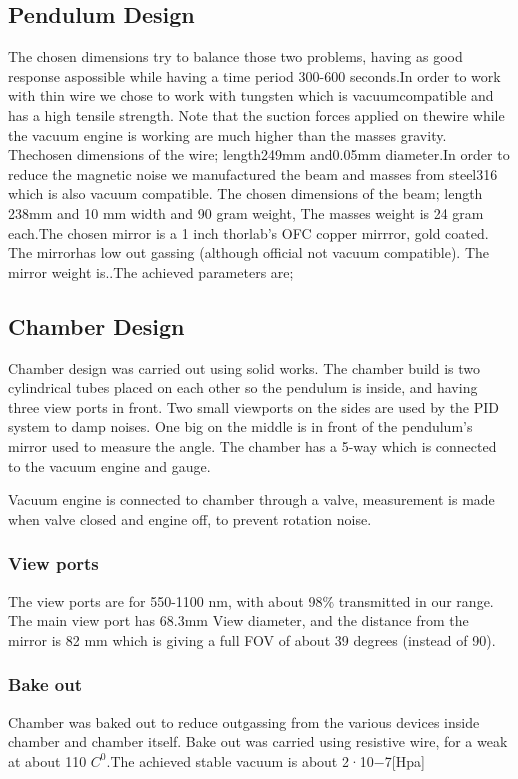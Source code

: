 \documentclass[\main/master.tex]{subfiles}
\begin{document}
\subsection{Pendulum Design}
The chosen dimensions try to balance those two problems, having as good response aspossible while having a time period 300-600 seconds.In order to work with thin wire we chose to work with tungsten which is vacuumcompatible and has a high tensile strength. Note that the suction forces applied on thewire while the vacuum engine is working are much higher than the masses gravity. Thechosen dimensions of the wire; length249mm and0.05mm diameter.In order to reduce the magnetic noise we manufactured the beam and masses from steel316 which is also vacuum compatible. The chosen dimensions of the beam; length 238mm and 10 mm width and 90 gram weight, The masses weight is 24 gram each.The chosen mirror is a 1 inch thorlab’s OFC copper mirrror, gold coated. The mirrorhas low out gassing (although official not vacuum compatible). The mirror weight is..The achieved parameters are;
\subsection{Chamber Design}
Chamber design was carried out using solid works. The chamber build is two cylindrical tubes placed on each other so the pendulum is inside, and having three view ports in front. Two small viewports on the sides are used by the PID system to damp noises. One big on the middle is in front of the pendulum's mirror  used to measure the angle. The chamber has a 5-way which is connected to the vacuum engine and gauge. 
\par
Vacuum engine is connected to chamber through a valve, measurement is made when valve closed and engine off, to prevent rotation noise.
\par
 
\subsubsection{View ports}
The view ports are for 550-1100 nm, with about 98$\%$ transmitted in our range. The main view port has 68.3mm View diameter, and the distance from the mirror is 82 mm which is giving a full FOV of about 39 degrees (instead of 90).
\subsubsection{Bake out}
Chamber was baked out to reduce outgassing from the various devices inside chamber and chamber itself. Bake out was carried using resistive wire, for a weak at about 110 $C^0$.The achieved stable vacuum is about 2·10−7[Hpa]
\end{document}
